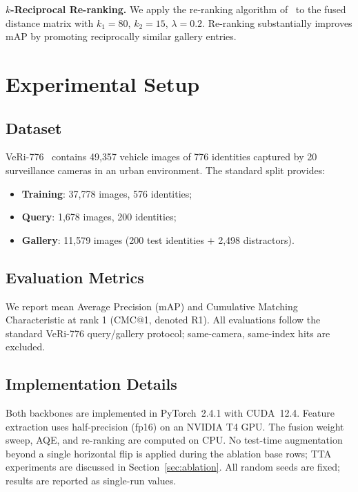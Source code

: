 \documentclass{ieeeaccess}
\newcommand{\rkk}{80}
\newcommand{\rkkii}{15}
\newcommand{\rklam}{0.2}
\begin{document}
\textbf{$k$-Reciprocal Re-ranking.}
We apply the re-ranking algorithm of~\cite{rerank} to the fused
distance matrix with $k_1{=}\rkk$, $k_2{=}\rkkii$, $\lambda{=}\rklam$.
Re-ranking substantially improves mAP by promoting reciprocally
similar gallery entries.

\section{Experimental Setup}
\label{sec:exp}

\subsection{Dataset}
VeRi-776~\cite{veri776} contains 49{,}357 vehicle images of 776
identities captured by 20 surveillance cameras in an urban environment.
The standard split provides:
\begin{itemize}
  \item \textbf{Training}: 37{,}778 images, 576 identities;
  \item \textbf{Query}: 1{,}678 images, 200 identities;
  \item \textbf{Gallery}: 11{,}579 images (200 test identities $+$
        2{,}498 distractors).
\end{itemize}

\subsection{Evaluation Metrics}
We report mean Average Precision (mAP) and Cumulative Matching
Characteristic at rank 1 (CMC@1, denoted R1).
All evaluations follow the standard VeRi-776 query/gallery protocol;
same-camera, same-index hits are excluded.

\subsection{Implementation Details}
Both backbones are implemented in PyTorch~2.4.1 with CUDA~12.4.
Feature extraction uses half-precision (fp16) on an NVIDIA T4 GPU.
The fusion weight sweep, AQE, and re-ranking are computed on CPU.
No test-time augmentation beyond a single horizontal flip is applied
during the ablation base rows; TTA experiments are discussed in
Section~\ref{sec:ablation}.
All random seeds are fixed; results are reported as single-run values.

\end{document}
